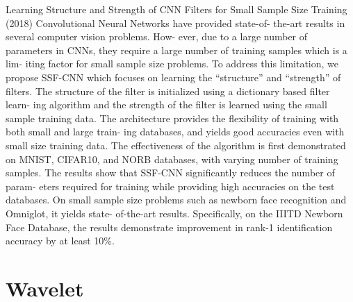 \documentclass[10pt]{beamer}
\begin{document}
\begin{frame}{Learning Structure and Strength of CNN Filters for Small Sample Size Training (2018)}
 Convolutional Neural Networks have provided state-of-
the-art results in several computer vision problems. How-
ever, due to a large number of parameters in CNNs, they
require a large number of training samples which is a lim-
iting factor for small sample size problems. To address this
limitation, we propose SSF-CNN which focuses on learning
the “structure” and “strength” of filters. The structure of
the filter is initialized using a dictionary based filter learn-
ing algorithm and the strength of the filter is learned using
the small sample training data. The architecture provides
the flexibility of training with both small and large train-
ing databases, and yields good accuracies even with small
size training data. The effectiveness of the algorithm is first
demonstrated on MNIST, CIFAR10, and NORB databases,
with varying number of training samples. The results show
that SSF-CNN significantly reduces the number of param-
eters required for training while providing high accuracies
on the test databases. On small sample size problems such
as newborn face recognition and Omniglot, it yields state-
of-the-art results. Specifically, on the IIITD Newborn Face
Database, the results demonstrate improvement in rank-1
identification accuracy by at least 10\%.
\end{frame}


\section{Wavelet}
\end{document}
